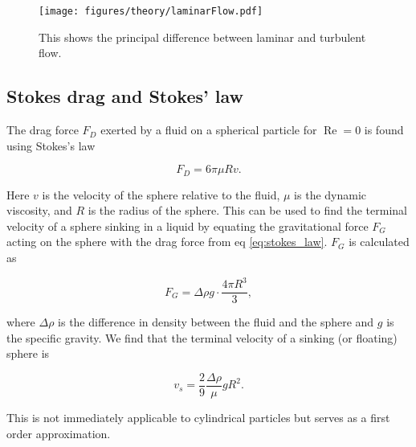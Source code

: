 \begin{figure}[H]
\centering
\texttt{[image: figures/theory/laminarFlow.pdf]}
\caption{This shows the principal difference between laminar and turbulent flow.}
\label{fig:laminar_flow}
\end{figure}

\subsection{Stokes drag and Stokes' law}
The drag force $F_D$ exerted by a fluid on a spherical particle for $\operatorname{Re} = 0$ is found using  Stokes's law \cite{introfluid2}

\begin{equation}\label{eq:stokes_law}
F_D = 6\pi \mu R v.
\end{equation}

\noindent Here $v$ is the velocity of the sphere relative to the fluid, $\mu$ is the dynamic viscosity, and $R$ is the radius of the sphere. This can be used to find the terminal velocity of a sphere sinking in a liquid by equating the gravitational force $F_G$ acting on the sphere with the drag force from eq \ref{eq:stokes_law}. $F_G$ is calculated as

\begin{equation}
F_G = \Delta \rho g\cdot \frac{4\pi R^3}{3},
\end{equation}

\noindent where $\Delta \rho$ is the difference in density between the fluid and the sphere and $g$ is the specific gravity. We find that the terminal velocity of a sinking (or floating) sphere is

\begin{equation}\label{eq:fallingSphere}
v_s = \frac{2}{9} \frac{\Delta \rho}{\mu} g R^2.
\end{equation}

\noindent This is not immediately applicable to cylindrical particles but serves as a first order approximation.